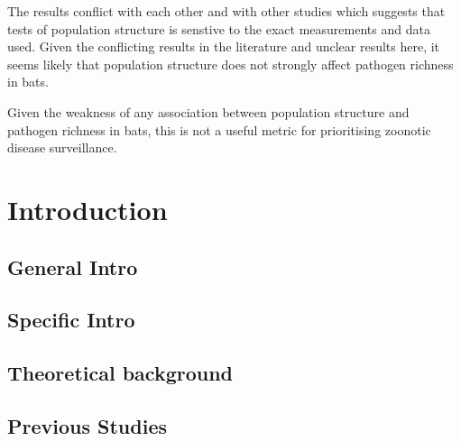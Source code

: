 The results conflict with each other and with other studies which suggests that tests of population structure is senstive to the exact measurements and data used.
Given the conflicting results in the literature and unclear results here, it seems likely that population structure does not strongly affect pathogen richness in bats.


Given the weakness of any association between population structure and pathogen richness in bats, this is not a useful metric for prioritising zoonotic disease surveillance.







\clearpage
\section{Introduction}

\subsection{General Intro}




\subsection{Specific Intro}



\subsection{Theoretical background}

\subsection{Previous Studies}

